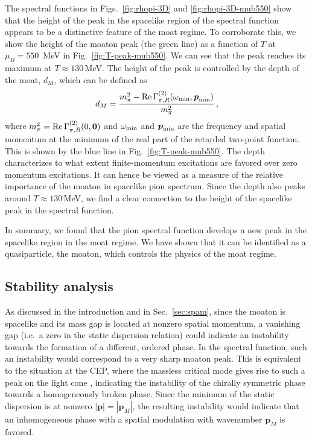 \documentclass[reprint,english,superscriptaddress,preprintnumbers,amsmath,amssymb,aps,prd,nofootinbib]{revtex4-2}
\newcommand{\bs}[1]{\boldsymbol{#1}}
\def\Fig#1{Fig.~\ref{#1}}
\def\Sec#1{Sec.~\ref{#1}}
\begin{document}
The spectral functions in Figs.\ \ref{fig:rhopi-3D} and \ref{fig:rhopi-3D-mub550} show that the height of the peak in the spacelike region of the spectral function appears to be a distinctive feature of the moat regime. To corroborate this, we show the height of the moaton peak (the green line) as a function of $T$ at $\mu_B = 550$\, MeV in \Fig{fig:T-peak-mub550}. We can see that the peak reaches its maximum at $T\approx 130$\,MeV. The height of the peak is controlled by the depth of the moat, $d_M$, which can be defined as
\begin{align}\label{eq:dm}
   d_M = \frac{m_\pi^2-{\rm Re}\,\Gamma_{\pi,R}^{(2)}(\omega_{\rm min},\bs{p}_{\rm min})}{m_\pi^2}\,,
\end{align}
where $m_\pi^2 = {\rm Re}\,\Gamma_{\pi,R}^{(2)}(0,\bs{0})$ and $\omega_{\rm min}$ and $\bs{p}_{\rm min}$ are the frequency and spatial momentum at the minimum of the real part of the retarded two-point function. This is shown by the blue line in \Fig{fig:T-peak-mub550}. The depth characterizes to what extent finite-momentum excitations are favored over zero momentum excitations. It can hence be viewed as a measure of the relative importance of the moaton in spacelike pion spectrum. Since the depth also peaks around $T\approx 130$\,MeV, we find a clear connection to the height of the spacelike peak in the spectral function.


In summary, we found that the pion spectral function develops a new peak in the spacelike region in the moat regime. We have shown that it can be identified as a quasiparticle, the moaton, which controls the physics of the moat regime.





\subsection{Stability analysis}
\label{sec:stabilityana}

As discussed in the introduction and in \Sec{sec:spam}, since the moaton is spacelike and its mass gap is located at nonzero spatial momentum, a vanishing gap (i.e.\ a zero in the static dispersion relation) could indicate an instability towards the formation of a different, ordered phase. In the spectral function, such an instability would correspond to a very sharp moaton peak. This is equivalent to the situation at the CEP, where the massless critical mode gives rise to such a peak on the light cone \cite{Fujii:2003bz}, indicating the instability of the chirally symmetric phase towards a homogeneously broken phase. Since the minimum of the static dispersion is at nonzero $|\bs{p}| = |\bs{p}_M|$, the resulting instability would indicate that an inhomogeneous phase with a spatial modulation with wavenumber $\bs{p}_M$ is favored. 
\end{document}

